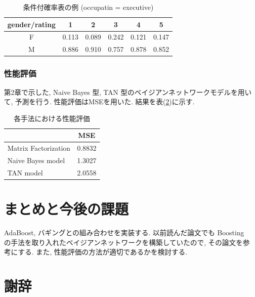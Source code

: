 \documentclass[a4paper]{jarticle}
\begin{document}
\begin{table}[H]
\begin{center}
\label{CPTsample}
\caption{条件付確率表の例 (occupatin = executive)}
\begin{tabular}{|c||c|c|c|c|c|} \hline  
gender/rating & 1 & 2 & 3 & 4 & 5 \\ \hline \hline
F & 0.113 & 0.089 & 0.242 & 0.121 & 0.147 \\
M & 0.886 & 0.910 & 0.757 & 0.878 & 0.852 \\ \hline
\end{tabular}
\end{center}
\end{table}

\subsubsection{性能評価}

第2章で示した, Naive Bayes 型, TAN 型のベイジアンネットワークモデルを用いて, 予測を行う. 性能評価はMSEを用いた. 結果を表(\ref{modelmse})に示す.

\begin{table}[H]
\begin{center}
\caption{各手法における性能評価}   %
\label{modelmse}   %
\begin{tabular}{l c}
\hline
                            & MSE \\ \hline
Matrix Factorization &  0.8832 \\ \hline
Naive Bayes model  & 1.3027 \\ \hline
TAN model             & 2.0558 \\ \hline
\end{tabular}
\end{center}
\end{table}

\section{まとめと今後の課題}

AdaBoost, バギングとの組み合わせを実装する. 以前読んだ論文でも Boosting の手法を取り入れたベイジアンネットワークを構築していたので, その論文を参考にする. また, 性能評価の方法が適切であるかを検討する. 

\section{謝辞}

\newpage
{} %




\end{document}

